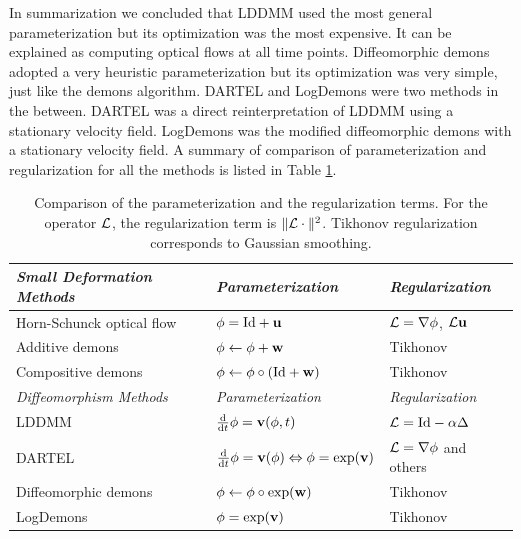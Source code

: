 \documentclass[letterpaper,12pt]{article}
\begin{document}
In summarization we concluded that LDDMM used the most general parameterization but its optimization was the most expensive. It can be explained as computing optical flows at all time points. Diffeomorphic demons adopted a very heuristic parameterization but its optimization was very simple, just like the demons algorithm. DARTEL and LogDemons were two methods in the between. DARTEL was a direct reinterpretation of LDDMM using a stationary velocity field. LogDemons was the modified diffeomorphic demons with a stationary velocity field. A summary of comparison of parameterization and regularization for all the methods is listed in Table \ref{tab:comp}.

\begin{table}
\begin{tabular}{|l|l|l|}
\hline
 \textit{Small Deformation Methods} & \textit{Parameterization} & \textit{Regularization} \\
 \hline
 Horn-Schunck optical flow \cite{Horn1981} & $\phi = \text{Id}+\mathbf{u}$ & $ \mathcal{L}=\nabla\phi$, $\mathcal{L}\mathbf{u}$ \\
 \hline
 Additive demons \cite{Thirion98,Vercauteren2009} & $\phi \leftarrow \phi+\mathbf{w} $ & Tikhonov \\
\hline
 Compositive demons \cite{Thirion98,Vercauteren2009} & $\phi \leftarrow \phi \circ (\text{Id}+\mathbf{w}) $ & Tikhonov \\
\hline
\hline
 \textit{Diffeomorphism Methods} & \textit{Parameterization} & \textit{Regularization} \\
 \hline
 LDDMM \cite{Beg2005Computing} & $\frac{\text{d}}{\text{d} t} \phi = \mathbf{v}(\phi,t)$ & $ \mathcal{L}=\text{Id}-\alpha\Delta$ \\
 \hline
 DARTEL \cite{Ashburner2007} & $\frac{\text{d}}{\text{d} t} \phi = \mathbf{v}(\phi) \Leftrightarrow \phi = \exp(\mathbf{v})$ & $\mathcal{L}=\nabla\phi$ and others \\
\hline
 Diffeomorphic demons \cite{Vercauteren2009} & $\phi \leftarrow \phi \circ \exp(\mathbf{w}) $ & Tikhonov\\
 \hline
 LogDemons \cite{Vercauteren2008Symmetric} & $\phi = \exp(\mathbf{v}) $ & Tikhonov\\
\hline
\end{tabular}
\caption{\label{tab:comp}
Comparison of the parameterization and the regularization terms. For the operator $\mathcal{L}$, the regularization term is $\|\mathcal{L} \cdot \|^2$. Tikhonov regularization corresponds to Gaussian smoothing.
}
\end{table}




\end{document}
